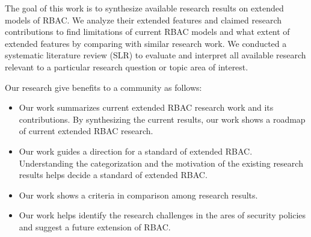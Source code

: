 The goal of this work is to synthesize available research results on extended models of RBAC. We analyze their extended features and claimed research contributions to find limitations of current RBAC models and what extent of extended features by
comparing with similar research work.
We conducted a systematic literature review (SLR) to evaluate and interpret all available research relevant to a particular research question or topic area of interest.

Our research give benefits to a community as follows:

\begin{itemize}
\item Our work summarizes current extended RBAC research work and its contributions. By synthesizing the current results, our work shows a roadmap of current extended RBAC research.
\item Our work guides a direction for a standard of extended RBAC. Understanding the categorization and the motivation of the existing research results helps decide a standard of extended RBAC.
\item Our work shows a criteria in comparison among research results.
\item Our work helps identify the research challenges in the ares of security policies and suggest a future extension of RBAC.
\end{itemize}
